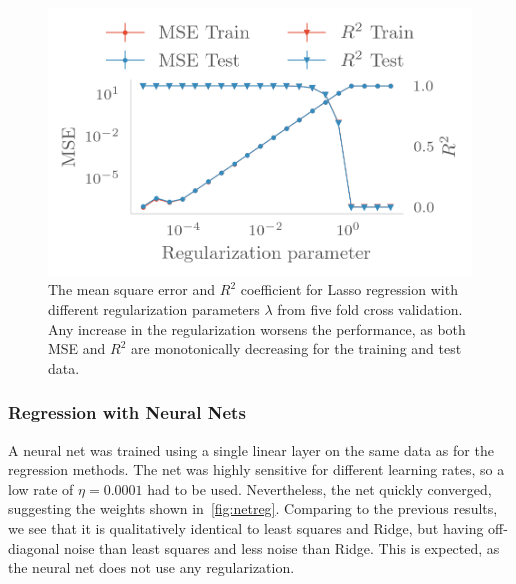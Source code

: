 \begin{figure}[H]
  \centering
  \includegraphics[]{figures/lasso_reg.png}
  \caption{\label{fig:lasso_reg} The mean square error and \(R^{2}\) coefficient
    for Lasso regression with different regularization parameters \(\lambda\)
    from five fold cross validation.
    Any increase in the regularization worsens the performance, as both MSE and
    \(R^{2}\) are monotonically decreasing for the training and test data.}
\end{figure}

\subsubsection{Regression with Neural Nets}

A neural net was trained using a single linear layer on the same data as for the
regression methods. The net was highly sensitive for different learning rates,
so a low rate of \(\eta = 0.0001\) had to be used. Nevertheless, the net quickly
converged, suggesting the weights shown in~\cref{fig:netreg}. Comparing to the
previous results, we see that it is qualitatively identical to least squares and
Ridge, but having off-diagonal noise than least squares and less noise than
Ridge. This is expected, as the neural net does not use any regularization.

